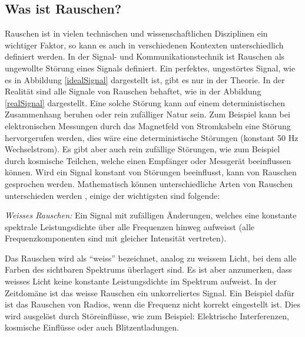 


\subsection{Was ist Rauschen?\label{brown:Rauschen:Arten}}

Rauschen ist in vielen technischen und wissenschaftlichen Disziplinen ein wichtiger Faktor, so kann es auch in verschiedenen Kontexten unterschiedlich definiert werden. In der Signal- und Kommunikationstechnik ist Rauschen als ungewollte Störung eines Signals definiert. Ein perfektes, ungestörtes Signal, wie es in Abbildung \ref{idealSignal} dargestellt ist, gibt es nur in der Theorie. In der Realität sind alle Signale von Rauschen behaftet, wie in der Abbildung \ref{realSignal} dargestellt. Eine solche Störung kann auf einem deterministischen Zusammenhang beruhen oder rein zufälliger Natur sein. Zum Beispiel kann bei elektronischen Messungen durch das Magnetfeld von Stromkabeln eine Störung hervorgerufen werden, dies wäre eine deterministische Störungen (konstant 50 Hz Wechselstrom). Es gibt aber auch rein zufällige Störungen, wie zum Beispiel durch kosmische Teilchen, welche einen Empfänger oder Messgerät beeinflussen können. Wird ein Signal konstant von Störungen beeinflusst, kann von Rauschen gesprochen werden. Mathematisch können unterschiedliche Arten von Rauschen unterschieden werden \cite{werner2008signale}, einige der wichtigsten sind folgende: 


\begin{definition}
{\em Weisses Rauschen:}
Ein Signal mit zufälligen Änderungen, welches eine konstante spektrale Leistungsdichte über alle Frequenzen hinweg aufweisst (alle Frequenzkomponenten sind mit gleicher Intensität vertreten).
\end{definition}

Das Rauschen wird als ``weiss'' bezeichnet, analog zu weissem Licht, bei dem alle Farben des sichtbaren Spektrums überlagert sind. Es ist aber anzumerken, dass weisses Licht keine konstante Leistungsdichte im Spektrum aufweist. In der Zeitdomäne ist das weisse Rauschen ein unkorreliertes Signal. Ein Beispiel dafür ist das Rauschen von Radios, wenn die Frequenz nicht korrekt eingestellt ist. Dies wird ausgelöst durch Störeinflüsse, wie zum Beispiel: Elektrische Interferenzen, kosmische Einflüsse oder auch Blitzentladungen.


